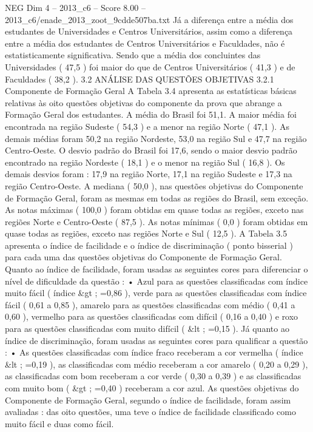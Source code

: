 \begin{textsample}{NEG Dim 4 – 2013\_c6 – Score 8.00 – 2013\_c6/enade\_2013\_zoot\_9cdde507ba.txt}
Já a diferença entre a média dos estudantes de Universidades e Centros Universitários, assim como a diferença entre a média dos estudantes de Centros Universitários e Faculdades, não é estatisticamente significativa.
Sendo que a média dos concluintes das Universidades ( 47,5 ) foi maior do que de Centros Universitários ( 41,3 ) e de Faculdades ( 38,2 ). 3.2 ANÁLISE DAS QUESTÕES OBJETIVAS 3.2.1 Componente de Formação Geral A Tabela 3.4 apresenta as estatísticas básicas relativas às oito questões objetivas do componente da prova que abrange a Formação Geral dos estudantes.
A média do Brasil foi 51,1.
A maior média foi encontrada na região Sudeste ( 54,3 ) e a menor na região Norte ( 47,1 ).
As demais médias foram 50,2 na região Nordeste, 53,0 na região Sul e 47,7 na região Centro-Oeste.
O desvio padrão do Brasil foi 17,6, sendo o maior desvio padrão encontrado na região Nordeste ( 18,1 ) e o menor na região Sul ( 16,8 ).
Os demais desvios foram : 17,9 na região Norte, 17,1 na região Sudeste e 17,3 na região Centro-Oeste.
A mediana ( 50,0 ), nas questões objetivas do Componente de Formação Geral, foram as mesmas em todas as regiões do Brasil, sem exceção.
As notas máximas ( 100,0 ) foram obtidas em quase todas as regiões, exceto nas regiões Norte e Centro-Oeste ( 87,5 ).
As notas mínimas ( 0,0 ) foram obtidas em quase todas as regiões, exceto nas regiões Norte e Sul ( 12,5 ).
A Tabela 3.5 apresenta o índice de facilidade e o índice de discriminação ( ponto bisserial ) para cada uma das questões objetivas do Componente de Formação Geral.
Quanto ao índice de facilidade, foram usadas as seguintes cores para diferenciar o nível de dificuldade da questão : • Azul para as questões classificadas com índice muito fácil ( índice \&gt ; =0,86 ), verde para as questões classificadas com índice fácil ( 0,61 a 0,85 ), amarelo para as questões classificadas com médio ( 0,41 a 0,60 ), vermelho para as questões classificadas com difícil ( 0,16 a 0,40 ) e roxo para as questões classificadas com muito difícil ( \&lt ; =0,15 ).
Já quanto ao índice de discriminação, foram usadas as seguintes cores para qualificar a questão : • As questões classificadas com índice fraco receberam a cor vermelha ( índice \&lt ; =0,19 ), as classificadas com médio receberam a cor amarelo ( 0,20 a 0,29 ), as classificadas com bom receberam a cor verde ( 0,30 a 0,39 ) e as classificadas com muito bom ( \&gt ; =0,40 ) receberam a cor azul.
As questões objetivas do Componente de Formação Geral, segundo o índice de facilidade, foram assim avaliadas : das oito questões, uma teve o índice de facilidade classificado como muito fácil e duas como fácil.

\end{textsample}
